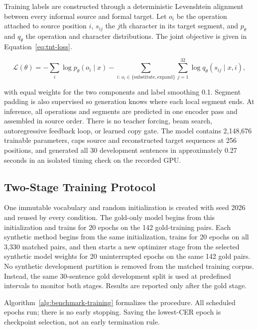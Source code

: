 \documentclass[12pt, a4paper, twoside, openany]{report}
\begin{document}
Training labels are constructed through a deterministic Levenshtein alignment between every informal source and formal target. Let $o_i$ be the operation attached to source position $i$, $s_{ij}$ the $j$th character in its target segment, and $p_\theta$ and $q_\theta$ the operation and character distributions. The joint objective is given in Equation~\eqref{eq:tnt-loss}.

\begin{equation}
	\mathcal{L}(\theta)=
	-\sum_i \log p_\theta(o_i\mid x)
	-\sum_{i:\,o_i\in\{\mathrm{substitute},\mathrm{expand}\}}
	 \sum_{j=1}^{32}\log q_\theta(s_{ij}\mid x,i),
	\label{eq:tnt-loss}
\end{equation}

with equal weights for the two components and label smoothing 0.1. Segment padding is also supervised so generation knows where each local segment ends. At inference, all operations and segments are predicted in one encoder pass and assembled in source order. There is no teacher forcing, beam search, autoregressive feedback loop, or learned copy gate. The model contains 2,148,676 trainable parameters, caps source and reconstructed target sequences at 256 positions, and generated all 30 development sentences in approximately 0.27 seconds in an isolated timing check on the recorded GPU.


\subsection{Two-Stage Training Protocol}

One immutable vocabulary and random initialization is created with seed 2026 and reused by every condition. The gold-only model begins from this initialization and trains for 20 epochs on the 142 gold-training pairs. Each synthetic method begins from the same initialization, trains for 20 epochs on all 3,330 matched pairs, and then starts a new optimizer stage from the selected synthetic model weights for 20 uninterrupted epochs on the same 142 gold pairs. No synthetic development partition is removed from the matched training corpus. Instead, the same 30-sentence gold development split is used at predefined intervals to monitor both stages. Results are reported only after the gold stage.

Algorithm~\ref{alg:benchmark-training} formalizes the procedure. All scheduled epochs run; there is no early stopping. Saving the lowest-CER epoch is checkpoint selection, not an early termination rule.
\end{document}
